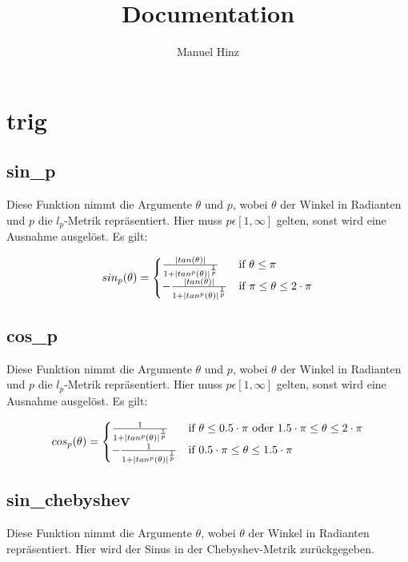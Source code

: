 \documentclass{article}
\title{Documentation}
\author{Manuel Hinz}
\begin{document}
\maketitle

\section{trig}

\subsection{sin\_p}

Diese Funktion nimmt die Argumente $\theta$ und $p$, wobei $\theta$ der Winkel in Radianten und $p$ die $l_p$-Metrik repräsentiert. Hier muss $p \epsilon [1, \infty]$ gelten, sonst wird eine Ausnahme ausgelöst. Es gilt:

\[   
sin_p(\theta) = 
     \begin{cases}
       \frac{|tan(\theta)|}{{1 + |tan^p(\theta)|}^{\frac{1}{p}}} & $if $\theta \leq \pi \\
       -\frac{|tan(\theta)|}{{1 + |tan^p(\theta)|}^{\frac{1}{p}}} & $if $\pi \leq \theta  \leq 2 \cdot \pi\\
     \end{cases}
\]

\subsection{cos\_p}

Diese Funktion nimmt die Argumente $\theta$ und $p$, wobei $\theta$ der Winkel in Radianten und $p$ die $l_p$-Metrik repräsentiert. Hier muss $p \epsilon [1, \infty]$ gelten, sonst wird eine Ausnahme ausgelöst. Es gilt:

\[   
cos_p(\theta) = 
     \begin{cases}
       \frac{1}{{1 + |tan^p(\theta)|}^{\frac{1}{p}}} & $if $\theta \leq 0.5 \cdot \pi  $ oder $1.5 \cdot \pi \leq \theta \leq 2 \cdot \pi \\
       -\frac{1}{{1 + |tan^p(\theta)|}^{\frac{1}{p}}} & $if $0.5 \cdot \pi \leq \theta \leq 1.5 \cdot \pi \\
     \end{cases}
\]

\subsection{sin\_chebyshev}

Diese Funktion nimmt die Argumente $\theta$, wobei $\theta$ der Winkel in Radianten repräsentiert. Hier wird der Sinus in der Chebyshev-Metrik zurückgegeben.
\end{document}
